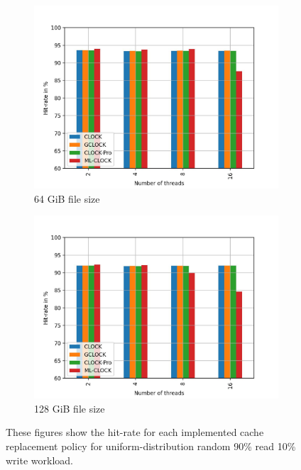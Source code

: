 \documentclass[
	12pt,
	a4paper,
	abstract,
	bibliography=totoc,
	chapterprefix,
	headings=openright,
	numbers=endperiod,
	parskip=half,
	twoside,
]{scrreprt}
\begin{document}
\begin{figure}[H]
\begin{subfigure}{0.4\textwidth}
		\includegraphics[width=\textwidth]{multi_64_gb_rw_90to10_uniform.jpg}		
		\caption{64 GiB file size}
		\label{fig:rw_90to10  zoned}
	\end{subfigure}
	\hfill
	\begin{subfigure}{0.4\textwidth}
		\includegraphics[width=\textwidth]{multi_128_gb_rw_90to10_uniform.jpg}		
		\caption{128 GiB file size}
		\label{fig:rw_90to10  uniform}
	\end{subfigure}
	\caption{These figures show the hit-rate for each implemented cache replacement policy for uniform-distribution random 90\% read 10\% write workload.}
\end{figure}
\end{document}
